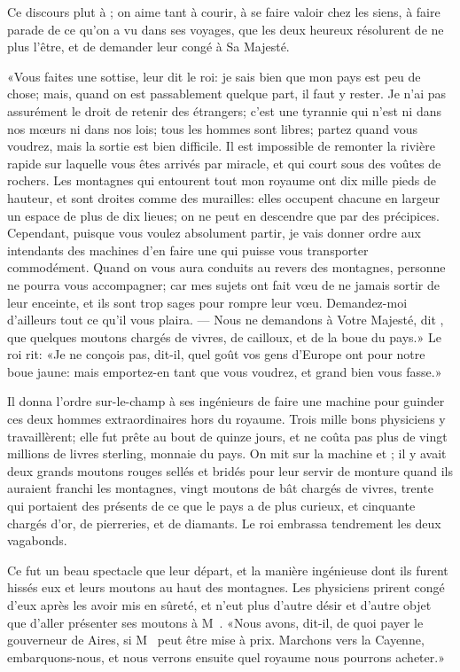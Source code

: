 Ce discours plut à ; on aime tant à courir, à se faire valoir
chez les siens, à faire parade de ce qu’on a vu dans ses voyages, que
les deux heureux résolurent de ne plus l’être, et de demander leur
congé à Sa Majesté.

«Vous faites une sottise, leur dit le roi: je sais bien que mon pays est
peu de chose; mais, quand on est passablement quelque part, il faut y
rester. Je n’ai pas assurément le droit de retenir des étrangers; c’est
une tyrannie qui n’est ni dans nos mœurs ni dans nos lois; tous les
hommes sont libres; partez quand vous voudrez, mais la sortie est bien
difficile. Il est impossible de remonter la rivière rapide sur laquelle
vous êtes arrivés par miracle, et qui court sous des voûtes de rochers.
Les montagnes qui entourent tout mon royaume ont dix mille pieds de
hauteur, et sont droites comme des murailles: elles occupent chacune en
largeur un espace de plus de dix lieues; on ne peut en descendre que
par des précipices. Cependant, puisque vous voulez absolument partir,
je vais donner ordre aux intendants des machines d’en faire une qui
puisse vous transporter commodément. Quand on vous aura conduits au
revers des montagnes, personne ne pourra vous accompagner; car mes
sujets ont fait vœu de ne jamais sortir de leur enceinte, et ils sont
trop sages pour rompre leur vœu. Demandez-moi d’ailleurs tout ce qu’il
vous plaira. — Nous ne demandons à Votre Majesté, dit , que
quelques moutons chargés de vivres, de cailloux, et de la boue du pays.»
Le roi rit: «Je ne conçois pas, dit-il, quel goût vos gens d’Europe ont
pour notre boue jaune: mais emportez-en tant que vous voudrez, et grand
bien vous fasse.»

Il donna l’ordre sur-le-champ à ses ingénieurs de faire une machine
pour guinder ces deux hommes extraordinaires hors du royaume. Trois
mille bons physiciens y travaillèrent; elle fut prête au bout de quinze
jours, et ne coûta pas plus de vingt millions de livres sterling,
monnaie du pays. On mit sur la machine  et ; il y avait
deux grands moutons rouges sellés et bridés pour leur servir de monture
quand ils auraient franchi les montagnes, vingt moutons de bât chargés
de vivres, trente qui portaient des présents de ce que le pays a de
plus curieux, et cinquante chargés d’or, de pierreries, et de diamants.
Le roi embrassa tendrement les deux vagabonds.

Ce fut un beau spectacle que leur départ, et la manière ingénieuse dont
ils furent hissés eux et leurs moutons au haut des montagnes. Les
physiciens prirent congé d’eux après les avoir mis en sûreté, et
 n’eut plus d’autre désir et d’autre objet que d’aller présenter
ses moutons à M~. «Nous avons, dit-il, de quoi payer
le gouverneur de  Aires, si M~ peut être mise
à prix. Marchons vers la Cayenne, embarquons-nous, et nous verrons
ensuite quel royaume nous pourrons acheter.»




